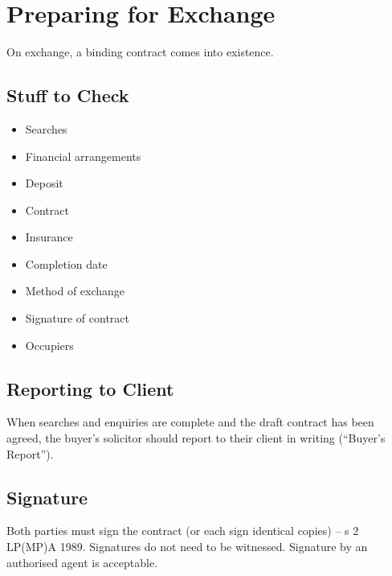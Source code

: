 \documentclass[
]{article}
\providecommand{\tightlist}{%
  \setlength{\itemsep}{0pt}\setlength{\parskip}{0pt}}
\begin{document}
\hypertarget{preparing-for-exchange}{%
\section{Preparing for Exchange}\label{preparing-for-exchange}}

On exchange, a binding contract comes into existence.

\hypertarget{stuff-to-check}{%
\subsection{Stuff to Check}\label{stuff-to-check}}

\begin{itemize}
\tightlist
\item
  Searches
\item
  Financial arrangements
\item
  Deposit
\item
  Contract
\item
  Insurance
\item
  Completion date
\item
  Method of exchange
\item
  Signature of contract
\item
  Occupiers
\end{itemize}

\hypertarget{reporting-to-client}{%
\subsection{Reporting to Client}\label{reporting-to-client}}

When searches and enquiries are complete and the draft contract has been
agreed, the buyer's solicitor should report to their client in writing
(``Buyer's Report'').

\hypertarget{signature}{%
\subsection{Signature}\label{signature}}

Both parties must sign the contract (or each sign identical copies) -- s
2 LP(MP)A 1989. Signatures do not need to be witnessed. Signature by an
authorised agent is acceptable.
\end{document}

